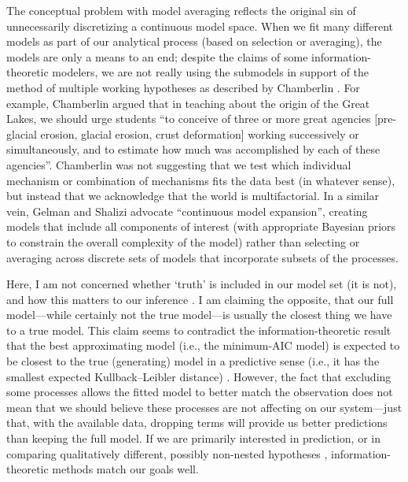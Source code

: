 \documentclass[entropy,article,accept,pdftex,moreauthors]{Definitions/mdpi}
\begin{document}
The conceptual problem with model averaging reflects the original sin of
unnecessarily discretizing a continuous model space. When we fit many
different models as part of our analytical process (based on selection
or averaging), the models are only a means to an end; despite the claims
of some information-theoretic modelers, we are not really using the
submodels in support of the method of multiple working hypotheses as
described by Chamberlin \cite{ref-chamberlinMethod1890}. For example, Chamberlin argued that in
teaching about the origin of the Great Lakes, we should urge students
``to conceive of three or more great agencies {[}pre-glacial erosion,
glacial erosion, crust deformation{]} working successively or
simultaneously, and to estimate how much was accomplished by each of
these agencies''. Chamberlin was {not} suggesting that we test
which individual mechanism or combination of mechanisms fits the data
best (in whatever sense), but instead that we acknowledge that the world
is multifactorial. In a similar vein, Gelman and Shalizi \cite{ref-gelmanPhilosophy2013} advocate
``continuous model expansion'', creating models that include all
components of interest (with appropriate Bayesian priors to constrain
the overall complexity of the model) rather than selecting or averaging
across discrete sets of models that incorporate subsets of the
processes.

Here, I am not concerned whether `truth' is included in our model set (it
is not), and how this matters to our inference \cite{ref-bernardoBayesian1994,ref-barker_truth_2015}.
I am claiming the opposite, that our full model---while certainly not the true model---is usually the closest
thing we have to a true model. This claim seems to contradict the
information-theoretic result that the best approximating model (i.e.,
the minimum-AIC model) is expected to be closest to the true
(generating) model in a predictive sense (i.e., it has the smallest
expected Kullback--Leibler distance) \cite{ref-poncianoMultimodel2018}. However,
the fact that excluding some processes allows the fitted model to better
match the observation does not mean that we should believe these
processes are not affecting on our system---just that, with the available
data, dropping terms will provide us better predictions than keeping the
full model. %
 If we are primarily interested in prediction, or in
 comparing qualitatively different, possibly non-nested hypotheses
 \cite{ref-luttbeg_comparing_2004}, information-theoretic methods
match our goals well.
\end{document}
